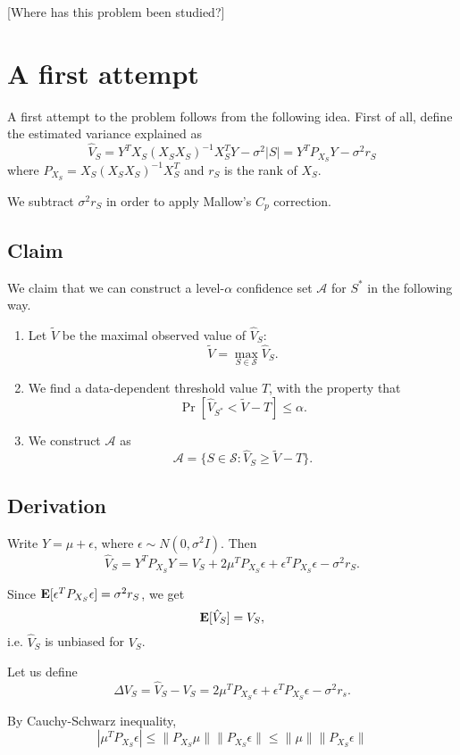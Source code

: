 \documentclass[12pt]{article}
\begin{document}
[Where has this problem been studied?]

\section{A first attempt}

A first attempt to the problem follows from the following idea.  First of all, define the estimated variance explained as
\[
\hat{V}_S = Y^T X_S (X_S X_S)^{-1} X_S^T Y - \sigma^2 |S| = Y^T P_{X_S} Y - \sigma^2 r_S
\]
where $P_{X_S} = X_S (X_S X_S)^{-1} X_S^T$ and $r_S$ is the rank of $X_S.$

We subtract $\sigma^2 r_S$ in order to apply Mallow's $C_p$ correction.

\subsection{Claim}

We claim that we can construct a level-$\alpha$ confidence set $\mathcal{A}$ for $S^*$ in the following way.

\begin{enumerate}
\item Let $\tilde{V}$ be the maximal observed value of $\hat{V}_S$:
\[
\tilde{V} = \max_{S \in \mathcal{S}} \hat{V}_S.
\]
\item We find a data-dependent threshold value $T$, with the property that
\[
\Pr[\hat{V}_{S^*} < \tilde{V} - T] \leq \alpha.
\]
\item We construct $\mathcal{A}$ as
\[
\mathcal{A} = \{S \in \mathcal{S}: \hat{V}_S \geq \tilde{V} - T \}.
\]
\end{enumerate}

\subsection{Derivation}


Write $Y = \mu + \epsilon$, where $\epsilon \sim N(0, \sigma^2 I)$.
Then
\[
\hat{V}_S =  Y^T P_{X_S} Y = V_S + 2 \mu^T P_{X_S} \epsilon + \epsilon^T P_{X_S} \epsilon - \sigma^2 r_S.
\]

Since $\textbf{E}[\epsilon^T P_{X_S} \epsilon] = \sigma^2 r_S$, we get
\[
\textbf{E}[\hat{V}_S] = V_S,
\]
i.e. $\hat{V}_S$ is unbiased for $V_S$.

Let us define
\[
\Delta V_S = \hat{V}_S - V_S  = 2 \mu^T P_{X_S} \epsilon + \epsilon^T P_{X_S} \epsilon - \sigma^2 r_s.
\]

By Cauchy-Schwarz inequality,
\[
|\mu^T P_{X_S} \epsilon | \leq \| P_{X_S} \mu\| \| P_{X_S} \epsilon \| \leq \|\mu\| \|P_{X_S} \epsilon \|
\]
\end{document}
